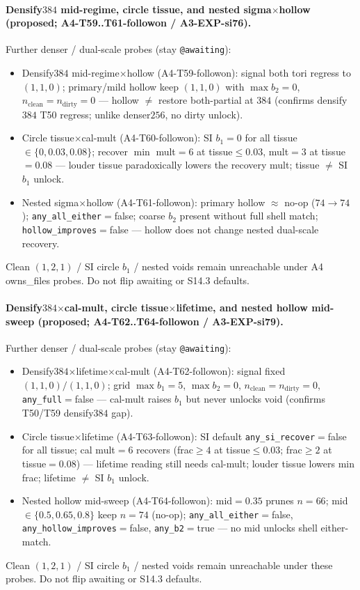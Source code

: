 \documentclass[11pt]{article}
\begin{document}
\paragraph{Densify$384$ mid-regime, circle tissue, and nested
sigma$\times$hollow (proposed; A4-T59..T61-followon / A3-EXP-si76).}
Further denser / dual-scale probes (stay \texttt{@awaiting}):
\begin{itemize}[leftmargin=1.5em]
  \item Densify$384$ mid-regime$\times$hollow (A4-T59-followon): signal
  both tori regress to $(1,1,0)$; primary/mild hollow keep $(1,1,0)$ with
  $\max b_2{=}0$, $n_{\mathrm{clean}}{=}n_{\mathrm{dirty}}{=}0$ --- hollow
  $\neq$ restore both-partial at $384$ (confirms densify$384$ T50
  regress; unlike denser$256$, no dirty unlock).
  \item Circle tissue$\times$cal-mult (A4-T60-followon): SI $b_1{=}0$ for
  all tissue$\in\{0,0.03,0.08\}$; recover $\min$ mult${=}6$ at
  tissue$\le 0.03$, mult${=}3$ at tissue${=}0.08$ --- louder tissue
  paradoxically lowers the recovery mult; tissue $\neq$ SI $b_1$ unlock.
  \item Nested sigma$\times$hollow (A4-T61-followon): primary hollow
  $\approx$ no-op ($74\to 74$); \texttt{any\_all\_either}${=}$false;
  coarse $b_2$ present without full shell match;
  \texttt{hollow\_improves}${=}$false --- hollow does not change nested
  dual-scale recovery.
\end{itemize}
Clean $(1,2,1)$ / SI circle $b_1$ / nested voids remain unreachable under
A4 owns\_files probes. Do not flip awaiting or S14.3 defaults.

\paragraph{Densify$384$$\times$cal-mult, circle tissue$\times$lifetime, and
nested hollow mid-sweep (proposed; A4-T62..T64-followon / A3-EXP-si79).}
Further denser / dual-scale probes (stay \texttt{@awaiting}):
\begin{itemize}[leftmargin=1.5em]
  \item Densify$384$$\times$lifetime$\times$cal-mult (A4-T62-followon):
  signal fixed $(1,1,0)/(1,1,0)$; grid $\max b_1{=}5$, $\max b_2{=}0$,
  $n_{\mathrm{clean}}{=}n_{\mathrm{dirty}}{=}0$,
  \texttt{any\_full}${=}$false --- cal-mult raises $b_1$ but never unlocks
  void (confirms T50/T59 densify$384$ gap).
  \item Circle tissue$\times$lifetime (A4-T63-followon): SI default
  \texttt{any\_si\_recover}${=}$false for all tissue; cal mult${=}6$
  recovers (frac$\ge 4$ at tissue$\le 0.03$; frac$\ge 2$ at tissue${=}0.08$)
  --- lifetime reading still needs cal-mult; louder tissue lowers min
  frac; lifetime $\neq$ SI $b_1$ unlock.
  \item Nested hollow mid-sweep (A4-T64-followon): mid${=}0.35$ prunes
  $n{=}66$; mid$\in\{0.5,0.65,0.8\}$ keep $n{=}74$ (no-op);
  \texttt{any\_all\_either}${=}$false,
  \texttt{any\_hollow\_improves}${=}$false, \texttt{any\_b2}${=}$true ---
  no mid unlocks shell either-match.
\end{itemize}
Clean $(1,2,1)$ / SI circle $b_1$ / nested voids remain unreachable under
these probes. Do not flip awaiting or S14.3 defaults.
\end{document}
